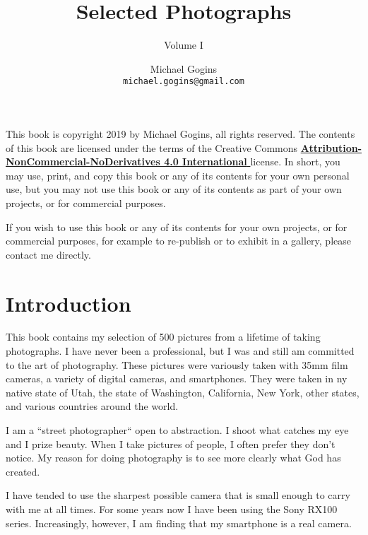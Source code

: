\documentclass[11pt,chapterprefix=true,pagesize=letter]{scrbook}
\begin{document}
\frontmatter
\title{Selected Photographs}
\author{Michael Gogins \\ \texttt{michael.gogins@gmail.com}}
\subtitle{Volume I}
\dedication{This book is for Mick.}
\newpage
\noindent This book is copyright 2019 by Michael Gogins, all rights reserved. The contents of this book are licensed under the terms of the Creative Commons \href{https://creativecommons.org/licenses/by-nc-nd/4.0/legalcode}{\textbf{Attribution-NonCommercial-NoDerivatives 4.0 International} } license. In short, you may use, print, and copy this book or any of its contents for your own personal use, but you may not use this book or any of its contents as part of your own projects, or for commercial purposes.

If you wish to use this book or any of its contents for your own projects, or for commercial purposes, for example to re-publish or to exhibit in a gallery, please contact me directly.
\maketitle

\tableofcontents
\listoffigures

\mainmatter
{}

\chapter{Introduction}

This book contains my selection of 500 pictures from a lifetime of taking photographs. I have never been a professional, but I was and still am committed to the art of photography. These pictures were variously taken with 35mm film cameras, a variety of digital cameras, and smartphones. They were taken in ny native state of Utah, the state of Washington, California, New York, other states, and various countries around the world. 

I am a ``street photographer`` open to abstraction. I shoot what catches my eye and I prize beauty. When I take pictures of people, I often prefer they don't notice. My reason for doing photography is to see more clearly what God has created.

I have tended to use the sharpest possible camera that is small enough to carry with me at all times. For some years now I have been using the Sony RX100 series. Increasingly, however, I am finding that my smartphone is a real camera.
\end{document}
